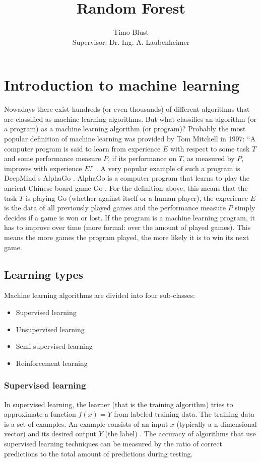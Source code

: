 \documentclass[a4paper]{report}
\title{Random Forest}
\author{Timo Blust\\[1cm]{\small Supervisor: Dr. Ing. A. Laubenheimer}}
\begin{document}
    \maketitle
    \tableofcontents
    
    \chapter{Introduction to machine learning}
    
    Nowadays there exist hundreds (or even thousands) of different algorithms that are classified as machine learning algorithms. But what classifies an algorithm (or a program) as a machine learning algorithm (or program)? Probably the most popular definition of machine learning was provided by Tom Mitchell in 1997: ``A computer program is said to learn from experience $E$ with respect to some task $T$ and some performance measure $P$, if its performance on $T$, as measured by $P$, improves with experience $E$.'' \cite{mitchell97}.
    A very popular example of such a program is DeepMind's AlphaGo \cite{alphago}. AlphaGo is a computer program that learns to play the ancient Chinese board game Go \cite{go}. For the definition above, this means that the task $T$ is playing Go (whether against itself or a human player), the experience $E$ is the data of all previously played games and the performance measure $P$ simply decides if a game is won or lost. If the program is a machine learning program, it has to improve over time (more formal: over the amount of played games). This means the more games the program played, the more likely it is to win its next game.
    
    \section{Learning types}
    
    Machine learning algorithms are divided into four sub-classes:
    \begin{itemize}
    \item Supervised learning
    \item Unsupervised learning
    \item Semi-supervised learning
    \item Reinforcement learning
    \end{itemize}
    
    \subsection{Supervised learning}
    \label{sec:supervised-learning}
    In supervised learning, the learner (that is the training algorithm) tries to approximate a function $f(x) = Y$ from labeled training data. The training data is a set of examples. An example consists of an input $x$ (typically a n-dimensional vector) and its desired output $Y$ (the label) \cite{supervised-learning}. The accuracy of algorithms that use supervised learning techniques can be measured by the ratio of correct predictions to the total amount of predictions during testing.
    
\end{document}
